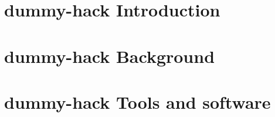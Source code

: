 


	\chapter{dummy-hack Introduction}
	\chapter{dummy-hack Background}
	\chapter{dummy-hack Tools and software}
	
	
	
	
